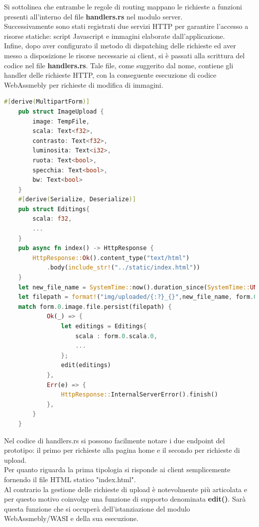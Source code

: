 Si sottolinea che entrambe le regole di routing mappano le richieste a funzioni presenti all'interno del file \textbf{handlers.rs} nel modulo server.
\\Successivamente sono stati registrati due servizi HTTP  per garantire l'accesso a risorse statiche: script Javascript e immagini elaborate dall'applicazione.
\\Infine, dopo aver configurato il metodo di dispatching delle richieste ed aver messo a disposizione le risorse necessarie ai client, si è passati alla scrittura del codice nel file \textbf{handlers.rs}. Tale file, come suggerito dal nome, contiene gli handler delle richieste HTTP, con la conseguente esecuzione di codice WebAssmebly per richieste di modifica di immagini.

\begin{lstlisting}[language=Rust,caption={Operazioni principali presenti nel file handlers.rs}, showstringspaces=false]
    #[derive(MultipartForm)]
    pub struct ImageUpload {
        image: TempFile,
        scala: Text<f32>,
        contrasto: Text<f32>,
        luminosita: Text<i32>,
        ruota: Text<bool>,
        specchia: Text<bool>,
        bw: Text<bool>
    }
    #[derive(Serialize, Deserialize)]
    pub struct Editings{
        scala: f32,
        ...
    }
    pub async fn index() -> HttpResponse {
        HttpResponse::Ok().content_type("text/html")
            .body(include_str!("../static/index.html"))
    }
    let new_file_name = SystemTime::now().duration_since(SystemTime::UNIX_EPOCH).unwrap();
    let filepath = format!("img/uploaded/{:?}_{}",new_file_name, form.0.file_name.as_str());
    match form.0.image.file.persist(filepath) {
            Ok(_) => {
                let editings = Editings{
                    scala : form.0.scala.0,
                    ...
                };
                edit(editings)
            },
            Err(e) => {
                HttpResponse::InternalServerError().finish()
            },
        }
    }
\end{lstlisting}
Nel codice di handlers.rs si possono facilmente notare i due endpoint del prototipo: il primo per richieste alla pagina home e il secondo per richieste di upload.
\\Per quanto riguarda la prima tipologia si risponde ai client semplicemente fornendo il file HTML statico "index.html".
\\Al contrario la gestione delle richieste di upload è notevolmente più articolata e per questo motivo coinvolge una funzione di supporto denominata \textbf{edit()}. Sarà questa funzione che si occuperà dell'istanziazione del modulo WebAssmebly/WASI e della sua esecuzione.
